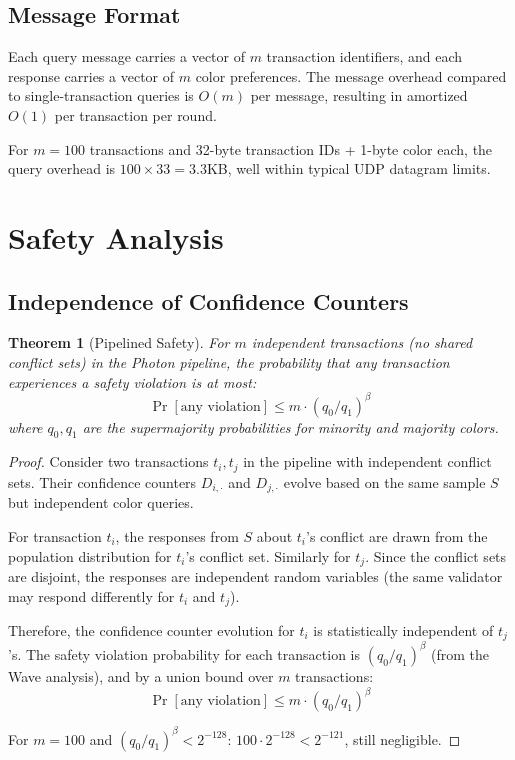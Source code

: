 \documentclass[11pt,a4paper]{article}
\newtheorem{theorem}{Theorem}[section]
\begin{document}
\subsection{Message Format}

Each query message carries a vector of $m$ transaction identifiers, and each response
carries a vector of $m$ color preferences. The message overhead compared to single-transaction
queries is $O(m)$ per message, resulting in amortized $O(1)$ per transaction per round.

For $m = 100$ transactions and 32-byte transaction IDs + 1-byte color each, the query
overhead is $100 \times 33 = 3.3$KB, well within typical UDP datagram limits.

\section{Safety Analysis}
\label{sec:safety}

\subsection{Independence of Confidence Counters}

\begin{theorem}[Pipelined Safety]
\label{thm:pipeline-safety}
For $m$ independent transactions (no shared conflict sets) in the Photon pipeline, the
probability that any transaction experiences a safety violation is at most:
\[
\Pr[\text{any violation}] \leq m \cdot (q_0/q_1)^\beta
\]
where $q_0, q_1$ are the supermajority probabilities for minority and majority colors.
\end{theorem}

\begin{proof}
Consider two transactions $t_i, t_j$ in the pipeline with independent conflict sets.
Their confidence counters $D_{i,\cdot}$ and $D_{j,\cdot}$ evolve based on the same
sample $S$ but independent color queries.

For transaction $t_i$, the responses from $S$ about $t_i$'s conflict are drawn from
the population distribution for $t_i$'s conflict set. Similarly for $t_j$. Since the
conflict sets are disjoint, the responses are independent random variables (the same
validator may respond differently for $t_i$ and $t_j$).

Therefore, the confidence counter evolution for $t_i$ is statistically independent of
$t_j$'s. The safety violation probability for each transaction is $(q_0/q_1)^\beta$
(from the Wave analysis), and by a union bound over $m$ transactions:
\[
\Pr[\text{any violation}] \leq m \cdot (q_0/q_1)^\beta
\]

For $m = 100$ and $(q_0/q_1)^\beta < 2^{-128}$: $100 \cdot 2^{-128} < 2^{-121}$,
still negligible.
\end{proof}
\end{document}
